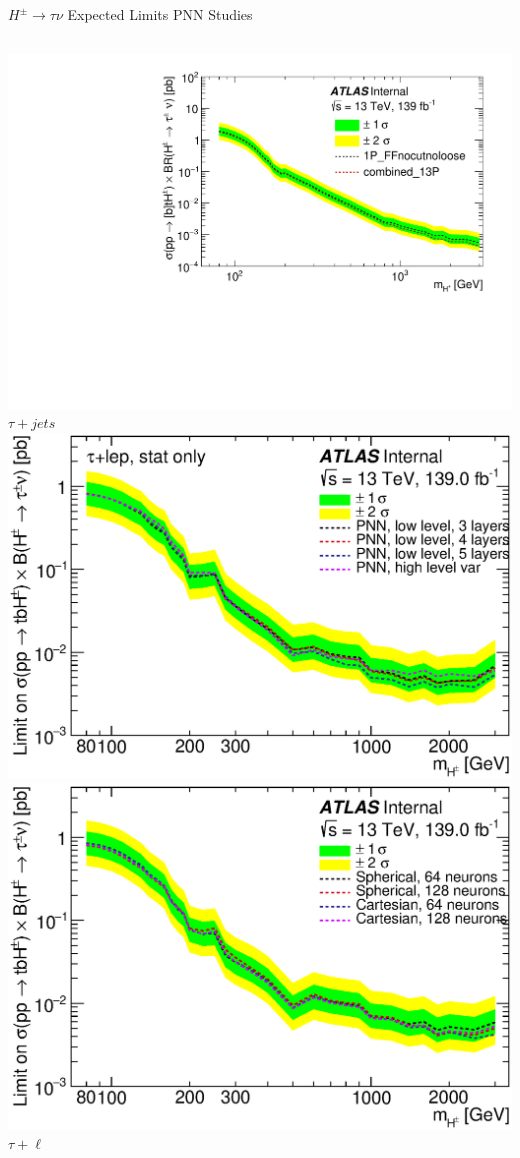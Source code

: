 \documentclass[aspectratio=169,xcolor=table]{beamer}
\begin{document}
    \begin{frame}{$H^{\pm} \rightarrow \tau\nu$ Expected Limits PNN Studies}
      \centering
      \small
      \begin{columns}
          \includegraphics[width=\textwidth,keepaspectratio=true]{Limits/exp_limit_log_1Pvs3P_taujet.pdf} \\
          \centering
          $\tau+jets$
          \centering
          \includegraphics[width=.55\textwidth,keepaspectratio=true]{Limits/taulep_fullmass_noCRTop_13p_lowLVL.eps} \\
          \includegraphics[width=.55\textwidth,keepaspectratio=true]{Limits/exp_limit_log_taulep_Coordinates.eps} \\
          \centering
          $\tau+\ell$
      \end{columns}
    \end{frame}
\end{document}
